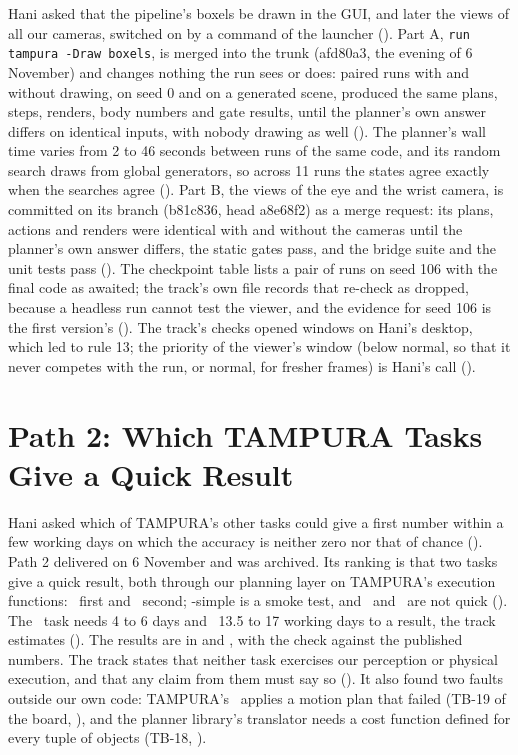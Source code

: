 Hani asked that the pipeline's boxels be drawn in the GUI, and later the views of
all our cameras, switched on by a command of the launcher (). Part A,
\texttt{run tampura -Draw boxels}, is merged into the trunk (afd80a3, the evening of
6 November) and changes nothing the run sees or does: paired runs with and without
drawing, on seed 0 and on a generated scene, produced the same plans, steps, renders,
body numbers and gate results, until the planner's own answer differs on identical
inputs, with nobody drawing as well (). The planner's wall time varies from 2 to
46 seconds between runs of the same code, and its random search draws from global
generators, so across 11 runs the states agree exactly when the searches agree
(). Part B, the views of the eye and the wrist camera, is committed on its
branch (b81c836, head a8e68f2) as a merge request: its plans, actions and renders
were identical with and without the cameras until the planner's own answer differs,
the static gates pass, and the bridge suite and the unit tests pass
(). The checkpoint table lists a pair of runs on
seed 106 with the final code as awaited; the track's own file records that re-check as
dropped, because a headless run cannot test the viewer, and the evidence for seed 106
is the first version's (). The track's checks opened windows on Hani's desktop,
which led to rule 13; the priority of the viewer's window (below normal, so that it
never competes with the run, or normal, for fresher frames) is Hani's call ().

\section{Path 2: Which TAMPURA Tasks Give a Quick Result}
\label{sec:path2}

Hani asked which of TAMPURA's other tasks could give a first number within a few
working days on which the accuracy is neither zero nor that of chance ().
Path 2 delivered on 6 November and was archived. Its ranking is that two tasks give
a quick result, both through our planning layer on TAMPURA's execution functions:
\cuncert\ first and \slamcol\ second; \fdice-simple is a smoke test, and \tooluse\ and
\puckslide\ are not quick (). The \tooluse\ task needs 4 to 6 days and
\puckslide\ 13.5 to 17 working days to a result, the track estimates (). The
results are in  and , with the check
against the published numbers. The track states that neither task exercises our
perception or physical execution, and that any claim from them must say so
(). It also found two faults outside our own code: TAMPURA's \cuncert\
applies a motion plan that failed (TB-19 of the board, ), and the planner
library's translator needs a cost function defined for every tuple of objects (TB-18,
\TK{3}).

